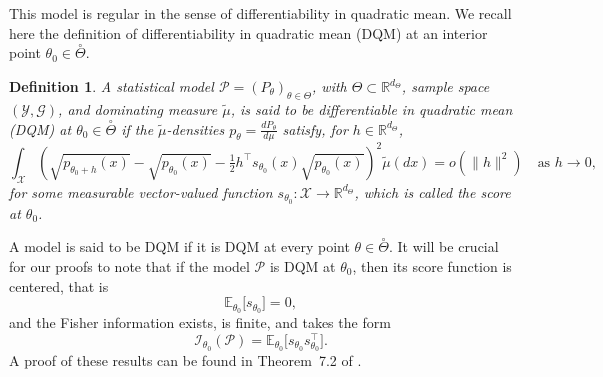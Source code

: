 \documentclass[a4paper, 11pt]{article}
\newtheorem{df}{Definition}
\theoremstyle{definition}
\newcommand{\modar}{\color{black}}
\begin{document}
{This model is regular in the sense of differentiability in quadratic mean. We recall here the definition of differentiability in quadratic mean (DQM) at an interior point $\theta_0 \in \overset{\circ}{\Theta}$.  

\begin{df}\label{def: DQM}
A statistical model $\mathcal{P} = (P_\theta)_{\theta \in \Theta}$, with $\Theta \subset \mathbb{R}^{d_\Theta}$, sample space {\modar $(\mathcal{Y}, \mathcal{G})$,} and dominating measure $\tilde{\mu}$, is said to be differentiable in quadratic mean (DQM) at $\theta_0 \in \overset{\circ}{\Theta}$ if the $\tilde{\mu}$-densities $p_\theta = \frac{dP_\theta}{d\mu}$ satisfy, for $h \in \mathbb{R}^{d_\Theta}$,
\[
\int_\mathcal{X} \left(
\sqrt{p_{\theta_0+h}(x)} - \sqrt{p_{\theta_0}(x)} - \tfrac{1}{2} h^{\top}s_{\theta_0}(x) \sqrt{p_{\theta_0}(x)}
\right)^2 \tilde{\mu}(dx) = o(\|h\|^2)
\quad \text{as } h \to 0,
\]
for some measurable vector-valued function $s_{\theta_0} : \mathcal{X} \to \mathbb{R}^{d_\Theta}$, which is called the score at $\theta_0$.
\end{df}

A model is said to be DQM if it is DQM at every point $\theta \in \overset{\circ}{\Theta}$. It will be crucial for our proofs to note that if the model $\mathcal{P}$ is DQM at $\theta_0$, then its score function is centered, that is
\begin{equation}\label{eq: score centered}
    \mathbb{E}_{\theta_0}\bigl[s_{\theta_0}\bigr] = 0,
\end{equation}
and the Fisher information exists, is finite, and takes the form
\[
\mathcal{I}_{\theta_0}(\mathcal{P}) = \mathbb{E}_{\theta_0}\bigl[s_{\theta_0} s_{\theta_0}^{\top}\bigr].
\]
A proof of these results can be found in Theorem~7.2 of \cite{Van07}.

}
\end{document}

